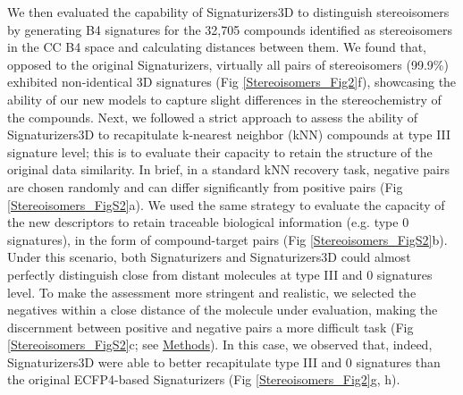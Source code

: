 We then evaluated the capability of Signaturizers3D to distinguish stereoisomers by generating B4 signatures for the 32,705 compounds identified as stereoisomers in the CC B4 space and calculating distances between them. We found that, opposed to the original Signaturizers, virtually all pairs of stereoisomers (99.9\%) exhibited non-identical 3D signatures (Fig \ref{Stereoisomers_Fig2}f), showcasing the ability of our new models to capture slight differences in the stereochemistry of the compounds. Next, we followed a strict approach to assess the ability of Signaturizers3D to recapitulate k-nearest neighbor (kNN) compounds at type III signature level; this is to evaluate their capacity to retain the structure of the original data similarity. In brief, in a standard kNN recovery task, negative pairs are chosen randomly and can differ significantly from positive pairs (Fig \ref{Stereoisomers_FigS2}a). We used the same strategy to evaluate the capacity of the new descriptors to retain traceable biological information (e.g. type 0 signatures), in the form of compound-target pairs (Fig \ref{Stereoisomers_FigS2}b). Under this scenario, both Signaturizers and Signaturizers3D could almost perfectly distinguish close from distant molecules at type III and 0 signatures level. To make the assessment more stringent and realistic, we selected the negatives within a close distance of the molecule under evaluation, making the discernment between positive and negative pairs a more difficult task (Fig \ref{Stereoisomers_FigS2}c; see \hyperref[Stereoisomers_Methods]{Methods}). In this case, we observed that, indeed, Signaturizers3D were able to better recapitulate type III and 0 signatures than the original ECFP4-based Signaturizers (Fig \ref{Stereoisomers_Fig2}g, h).